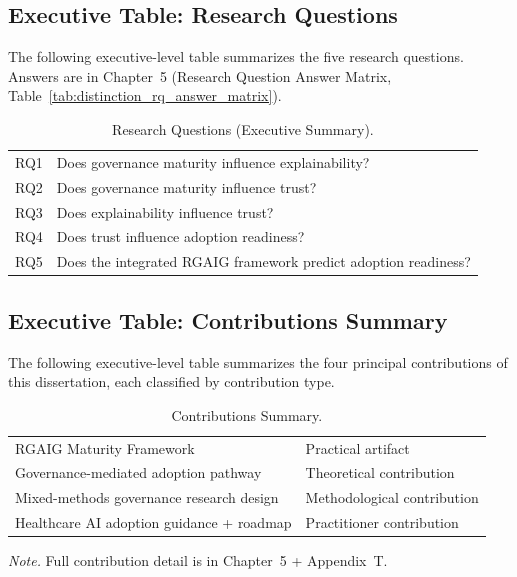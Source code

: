 \subsection{Executive Table: Research Questions}
\label{sec:exec_research_questions}

\noindent The following executive-level table summarizes the five research questions. Answers are in Chapter~5 (Research Question Answer Matrix, Table~\ref{tab:distinction_rq_answer_matrix}).

{\tablestripes\tablefontsize
{}
\begin{xltabular}{\textwidth}{@{} >{\raggedright\arraybackslash}p{6cm} L @{}}
\caption[Research Questions (Executive Summary)]{Research Questions (Executive Summary).}\label{tab:exec_research_questions} \\
\toprule
{} &  \\
\midrule
\endfirsthead
\endhead
\bottomrule
\endlastfoot
RQ1 & Does governance maturity influence explainability? \\
\addlinespace
RQ2 & Does governance maturity influence trust? \\
\addlinespace
RQ3 & Does explainability influence trust? \\
\addlinespace
RQ4 & Does trust influence adoption readiness? \\
\addlinespace
RQ5 & Does the integrated RGAIG framework predict adoption readiness? \\
\end{xltabular}}


\subsection{Executive Table: Contributions Summary}
\label{sec:exec_contributions}

\noindent The following executive-level table summarizes the four principal contributions of this dissertation, each classified by contribution type.

{\tablestripes\tablefontsize
{}
\begin{xltabular}{\textwidth}{@{} >{\raggedright\arraybackslash}p{6cm} L @{}}
\caption[Contributions Summary]{Contributions Summary.}\label{tab:exec_contributions} \\
\toprule
{} &  \\
\midrule
\endfirsthead
\endhead
\bottomrule
\endlastfoot
RGAIG Maturity Framework & Practical artifact \\
\addlinespace
Governance-mediated adoption pathway & Theoretical contribution \\
\addlinespace
Mixed-methods governance research design & Methodological contribution \\
\addlinespace
Healthcare AI adoption guidance + roadmap & Practitioner contribution \\
\end{xltabular}}
\vspace{0.3em}\noindent\textit{Note.} Full contribution detail is in Chapter~5 + Appendix~T.


